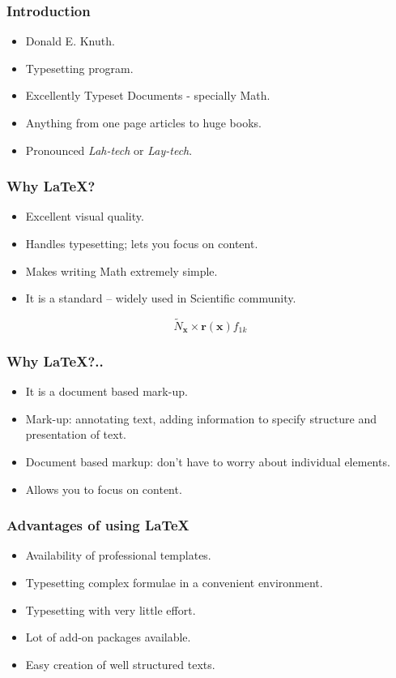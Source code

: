 \documentclass[17pt,compress]{beamer}
\begin{document}
\begin{frame}[fragile]
  \frametitle{Introduction}
    \begin{itemize}
     \item Donald E. Knuth.
      \item Typesetting program.
      \item Excellently Typeset Documents - specially Math.
      \item Anything from one page articles to huge books.
      \item Pronounced \emph{Lah-tech} or \emph{Lay-tech}.
    \end{itemize}
\end{frame}

\begin{frame}[fragile]
  \frametitle{Why {\LaTeX}?}
  \begin{itemize}
  \item Excellent visual quality. 
  \item Handles typesetting; lets you focus on content.
  \item Makes writing Math extremely simple.
  \item It is a standard -- widely used in Scientific community.
  \end{itemize}
    \[\tilde{N}_{\mathbf{x}}\times \mathbf{r}(\mathbf{x}) f_{1k} \]
\end{frame}

\begin{frame}[fragile]
  \frametitle{Why \LaTeX?..}
  \begin{itemize}
  \item It is a document based mark-up.
  \item Mark-up: annotating text, adding
    information to specify structure and presentation of text.
  \item Document based markup: don't have to worry
    about individual elements. 
  \item Allows you to focus on content.
  \end{itemize}
\end{frame}

\begin{frame}[fragile]
  \frametitle{Advantages of using \LaTeX }
  \begin{itemize}
    \item Availability of professional templates.
    \item Typesetting complex formulae in a convenient environment.
    \item Typesetting with very little effort.
    \item Lot of add-on packages available.
    \item Easy creation of well structured texts.
  \end{itemize}
\end{frame}
\end{document}
